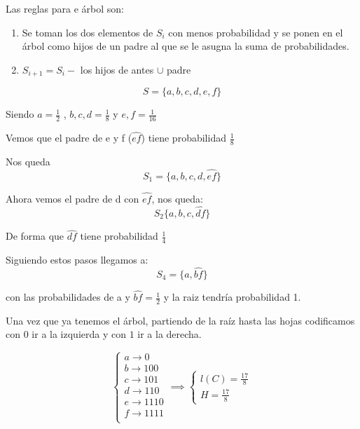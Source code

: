 Las reglas para e árbol son:
\begin{enumerate}
	\item Se toman los dos elementos de $S_i$ con menos probabilidad y se ponen en el árbol como hijos de un padre al que se le asugna la suma de probabilidades.
	\item $S_{i+1} = S_i - $ {los hijos de antes} $\cup$ {padre}
\end{enumerate}
\begin{example}
	$$S =\{ a, b , c, d, e , f \}$$
	
	Siendo $a = \frac{1}{2}$ , $b, c,d = \frac{1}{8}$ y $e, f = \frac{1}{16}$
	
	Vemos que el padre de e y f ($\widehat{ef}$) tiene probabilidad $\frac{1}{8}$
	
	Nos queda
	$$S_1 = \{a,b,c,d,\widehat{ef}\}$$
	
	
	Ahora vemos el padre de d con $\widehat{ef}$, nos queda:
	$$S_2\{ a, b,c,\widehat{df}\}$$
	
	De forma que $\widehat{df}$ tiene probabilidad $\frac{1}{4}$
	
	Siguiendo estos pasos llegamos a:
	$$S_4 = \{ a , \widehat{bf}\}$$
	
	con las probabilidades de a y $\widehat{bf} = \frac{1}{2}$ y la raiz tendría probabilidad 1.
	
	Una vez que ya tenemos el árbol, partiendo de la raíz hasta las hojas codificamos con $0$ ir a la izquierda y con $1$ ir a la derecha.
	
	$$\begin{cases}
	a \rightarrow 0 \\
	b \rightarrow 100 \\
	c \rightarrow 101 \\
	d \rightarrow 110 \\
	e \rightarrow 1110 \\
	f \rightarrow 1111 \\
	\end{cases} \implies \begin{cases}
	l(C) = \frac{17}{8}\\
	H = \frac{17}{8}
	\end{cases}$$ 
\end{example}

